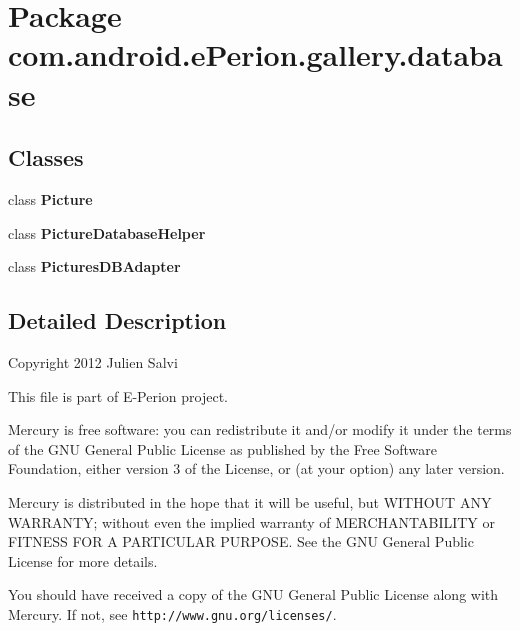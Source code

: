 \section{Package com.\-android.\-e\-Perion.\-gallery.\-database}
\label{namespacecom_1_1android_1_1e_perion_1_1gallery_1_1database}
\subsection*{Classes}
\begin{DoxyCompactItemize}
\item 
class {\bf Picture}
\item 
class {\bf Picture\-Database\-Helper}
\item 
class {\bf Pictures\-D\-B\-Adapter}
\end{DoxyCompactItemize}


\subsection{Detailed Description}
Copyright 2012 Julien Salvi

This file is part of E-\/\-Perion project.

Mercury is free software\-: you can redistribute it and/or modify it under the terms of the G\-N\-U General Public License as published by the Free Software Foundation, either version 3 of the License, or (at your option) any later version.

Mercury is distributed in the hope that it will be useful, but W\-I\-T\-H\-O\-U\-T A\-N\-Y W\-A\-R\-R\-A\-N\-T\-Y; without even the implied warranty of M\-E\-R\-C\-H\-A\-N\-T\-A\-B\-I\-L\-I\-T\-Y or F\-I\-T\-N\-E\-S\-S F\-O\-R A P\-A\-R\-T\-I\-C\-U\-L\-A\-R P\-U\-R\-P\-O\-S\-E. See the G\-N\-U General Public License for more details.

You should have received a copy of the G\-N\-U General Public License along with Mercury. If not, see {\tt http\-://www.\-gnu.\-org/licenses/}. 